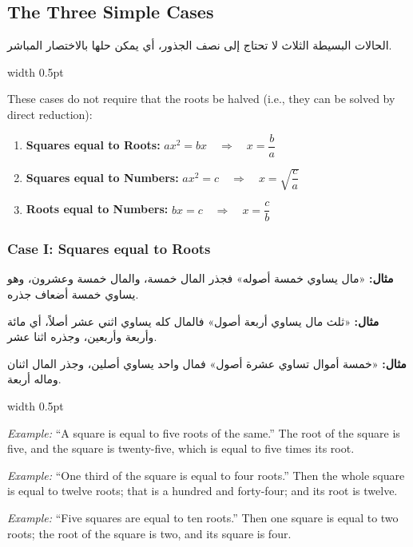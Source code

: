 \documentclass[10pt,a4paper]{book}
\newlength{\colwidth}
\newcommand{\bilingualpair}[2]{%
  \noindent
  \begin{minipage}[t]{\colwidth}
  \begin{flushright}
  \vspace{0pt}
  {\arabicfont\small #1}
  \end{flushright}
  \end{minipage}%
  \hfill\textcolor{columnsepclr}{\vrule width 0.5pt}\hfill
  \begin{minipage}[t]{\colwidth}
  \vspace{0pt}
  {\small #2}
  \end{minipage}%
  \par\vspace{0.6em}
}
\begin{document}
\subsection{The Three Simple Cases}

\bilingualpair{
الحالات البسيطة الثلاث لا تحتاج إلى نصف الجذور، أي يمكن حلها
بالاختصار المباشر.
}{
These cases do not require that the roots be halved (i.e., they can be solved
by direct reduction):
}

\vspace{0.5em}
\begin{mathbox}[title={\textbf{Simple Cases (do not require halving)}}]
\begin{enumerate}[label=\textbf{Case \Roman*:},leftmargin=3em]
  \item \textbf{Squares equal to Roots:}
  $ax^2 = bx \quad\Longrightarrow\quad x = \dfrac{b}{a}$
  
  \item \textbf{Squares equal to Numbers:}
  $ax^2 = c \quad\Longrightarrow\quad x = \sqrt{\dfrac{c}{a}}$
  
  \item \textbf{Roots equal to Numbers:}
  $bx = c \quad\Longrightarrow\quad x = \dfrac{c}{b}$
\end{enumerate}
\end{mathbox}
\vspace{0.5em}

\subsubsection*{Case I: Squares equal to Roots}

\bilingualpair{
\textbf{مثال:} «مال يساوي خمسة أصوله» فجذر المال خمسة، والمال خمسة
وعشرون، وهو يساوي خمسة أضعاف جذره.

\textbf{مثال:} «ثلث مال يساوي أربعة أصول» فالمال كله يساوي اثني عشر
أصلاً، أي مائة وأربعة وأربعين، وجذره اثنا عشر.

\textbf{مثال:} «خمسة أموال تساوي عشرة أصول» فمال واحد يساوي أصلين،
وجذر المال اثنان وماله أربعة.
}{
\textit{Example:} ``A square is equal to five roots of the same.'' The root of
the square is five, and the square is twenty-five, which is equal to five times
its root.

\textit{Example:} ``One third of the square is equal to four roots.'' Then the
whole square is equal to twelve roots; that is a hundred and forty-four; and
its root is twelve.

\textit{Example:} ``Five squares are equal to ten roots.'' Then one square is
equal to two roots; the root of the square is two, and its square is four.
}
\end{document}
